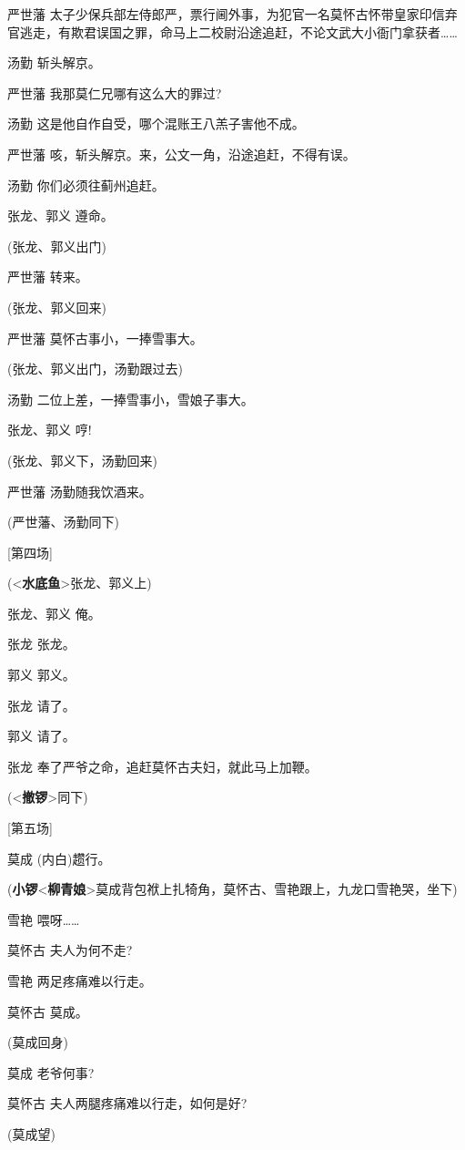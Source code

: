 严世藩
太子少保兵部左侍郎严，票行阃外事，为犯官一名莫怀古怀带皇家印信弃官逃走，有欺君误国之罪，命马上二校尉沿途追赶，不论文武大小衙门拿获者\ldots{}\ldots{}

汤勤 斩头解京。

严世藩 我那莫仁兄哪有这么大的罪过?

汤勤 这是他自作自受，哪个混账王八羔子害他不成。

严世藩 咳，斩头解京。来，公文一角，沿途追赶，不得有误。

汤勤 你们必须往蓟州追赶。

张龙、郭义 遵命。

(张龙、郭义出门)

严世藩 转来。

(张龙、郭义回来)

严世藩 莫怀古事小，一捧雪事大。

(张龙、郭义出门，汤勤跟过去)

汤勤 二位上差，一捧雪事小，雪娘子事大。

张龙、郭义 哼!

(张龙、郭义下，汤勤回来)

严世藩 汤勤随我饮酒来。

(严世藩、汤勤同下)

{[}第四场{]}

(\textless{}\textbf{水底鱼}\textgreater{}张龙、郭义上)

张龙、郭义 俺。

张龙 张龙。

郭义 郭义。

张龙 请了。

郭义 请了。

张龙 奉了严爷之命，追赶莫怀古夫妇，就此马上加鞭。

(\textless{}\textbf{撤锣}\textgreater{}同下)

{[}第五场{]}

莫成 (内白)趱行。

(\textbf{小锣}\textless{}\textbf{柳青娘}\textgreater{}莫成背包袱上扎犄角，莫怀古、雪艳跟上，九龙口雪艳哭，坐下)

雪艳 喂呀\ldots{}\ldots{}

莫怀古 夫人为何不走?

雪艳 两足疼痛难以行走。

莫怀古 莫成。

(莫成回身)

莫成 老爷何事?

莫怀古 夫人两腿疼痛难以行走，如何是好?

(莫成望)

